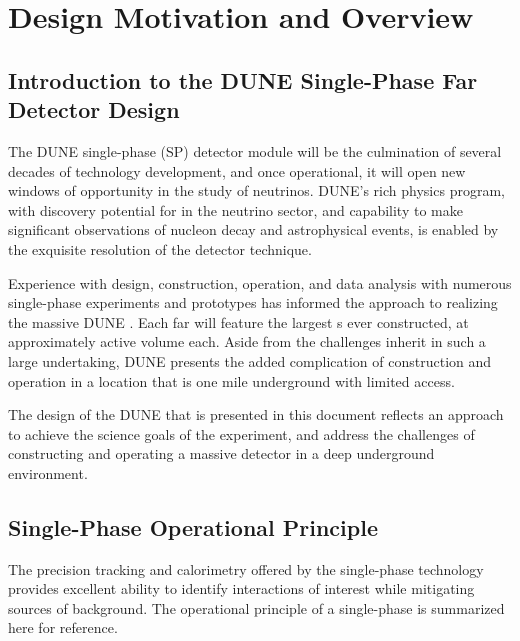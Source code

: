 \chapter{Design Motivation and Overview}
\label{ch:fdsp-apa-design}

\section{Introduction to the DUNE Single-Phase Far Detector Design}
\label{sec:fdsp-design-intro}

The DUNE single-phase (SP) \lartpc detector module will be the culmination of several decades
of \lartpc technology development, and once operational, it will open new windows of opportunity in the study of neutrinos.  DUNE's rich physics program, with discovery
potential for  in the neutrino sector, and capability to make
significant observations of nucleon decay and astrophysical events, is enabled
by the exquisite resolution of the \lartpc detector technique.

Experience with design, construction, operation, and data
analysis with numerous single-phase \lartpc experiments and prototypes has informed the approach to
realizing the massive DUNE . Each far  will feature the largest \lartpc{}s ever
constructed, at approximately \nominalmodsize active volume each.  Aside from the
challenges inherit in such a large undertaking, DUNE presents the added complication of construction and operation in a location
that is one mile underground with limited access.

The design of the DUNE  that is presented in this document
reflects an approach to achieve the science goals of the experiment, and
address the challenges of constructing and operating a massive detector in a deep
underground environment.


\section{Single-Phase \lartpc Operational Principle}
\label{sec:fdsp-design-op}

The precision tracking and calorimetry offered by the single-phase \lartpc
technology provides excellent ability to identify interactions of interest
while mitigating sources of background.  The operational principle of a
single-phase \lartpc is summarized here for reference.

